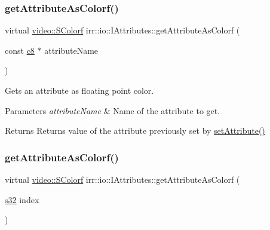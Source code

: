 \subsubsection{\texorpdfstring{get\+Attribute\+As\+Colorf()}{getAttributeAsColorf()}\hspace{0.1cm}{\footnotesize\ttfamily [1/2]}}
{\footnotesize\ttfamily virtual \hyperlink{classirr_1_1video_1_1SColorf}{video\+::\+S\+Colorf} irr\+::io\+::\+I\+Attributes\+::get\+Attribute\+As\+Colorf (\begin{DoxyParamCaption}\item[{const \hyperlink{namespaceirr_a9395eaea339bcb546b319e9c96bf7410}{c8} $\ast$}]{attribute\+Name }\end{DoxyParamCaption})\hspace{0.3cm}{\ttfamily [pure virtual]}}



Gets an attribute as floating point color. 


\begin{DoxyParams}{Parameters}
{\em attribute\+Name} & Name of the attribute to get. \\
\hline
\end{DoxyParams}
\begin{DoxyReturn}{Returns}
Returns value of the attribute previously set by \hyperlink{classirr_1_1io_1_1IAttributes_a03fa31acb481ae23678676cc183f09a6}{set\+Attribute()} 
\end{DoxyReturn}
\mbox{\label{classirr_1_1io_1_1IAttributes_a3400093bf32360c0b2916b94ad0bdbdd}} 
\subsubsection{\texorpdfstring{get\+Attribute\+As\+Colorf()}{getAttributeAsColorf()}\hspace{0.1cm}{\footnotesize\ttfamily [2/2]}}
{\footnotesize\ttfamily virtual \hyperlink{classirr_1_1video_1_1SColorf}{video\+::\+S\+Colorf} irr\+::io\+::\+I\+Attributes\+::get\+Attribute\+As\+Colorf (\begin{DoxyParamCaption}\item[{\hyperlink{namespaceirr_ac66849b7a6ed16e30ebede579f9b47c6}{s32}}]{index }\end{DoxyParamCaption})\hspace{0.3cm}{\ttfamily [pure virtual]}}



